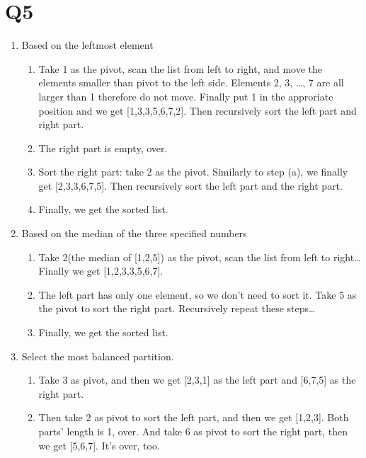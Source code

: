 \documentclass{article}
\begin{document}
\begin{sloppypar}
\section*{Q5}
\begin{enumerate}
    \item Based on the leftmost element
        \begin{enumerate}
            \item Take 1 as the pivot, scan the list from left to right, and 
                    move the elements smaller than pivot to the left side.
                    Elements 2, 3, \dots, 7 are all larger than 1 therefore do
                    not move. Finally put 1 in the approriate position and we get
                    [1,3,3,5,6,7,2]. Then recursively sort the left part and right part.
            \item The right part is empty, over.
            \item Sort the right part: take 2 as the pivot. Similarly to step (a),
                    we finally get [2,3,3,6,7,5]. Then recursively sort the left part
                    and the right part.
            \item Finally, we get the sorted list.
        \end{enumerate}
    \item Based on the median of the three specified numbers
        \begin{enumerate}
            \item Take 2(the median of [1,2,5]) as the pivot, scan the list
                    from left to right\ldots Finally we get [1,2,3,3,5,6,7].
            \item The left part has only one element, so we don't need to sort it.
                    Take 5 as the pivot to sort the right part. Recursively repeat
                    these steps\dots
            \item Finally, we get the sorted list.
        \end{enumerate}
    \item Select the most balanced partition.
            \begin{enumerate}
                \item Take 3 as pivot, and then we get [2,3,1] as the left part
                        and [6,7,5] as the right part.
                \item Then take 2 as pivot to sort the left part, and then we get
                        [1,2,3]. Both parts' length is 1, over. And take 6 as pivot
                        to sort the right part, then we get [5,6,7]. It's over, too.

            \end{enumerate}
\end{enumerate}
\end{sloppypar}
\end{document}
